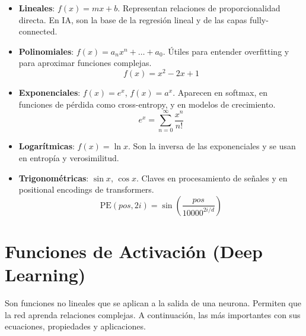 \documentclass[12pt,a4paper,openany,oneside]{book}
\begin{document}
\begin{itemize}
    \item \textbf{Lineales}: $f(x) = mx + b$. Representan relaciones de proporcionalidad directa. En IA, son la base de la regresión lineal y de las capas fully-connected.
    \begin{center}
    \end{center}
    
    \item \textbf{Polinomiales}: $f(x) = a_n x^n + \dots + a_0$. Útiles para entender overfitting y para aproximar funciones complejas.
    \begin{equation*}
    f(x) = x^2 - 2x + 1
    \end{equation*}
    
    \item \textbf{Exponenciales}: $f(x) = e^x$, $f(x) = a^x$. Aparecen en softmax, en funciones de pérdida como cross-entropy, y en modelos de crecimiento.
    \begin{equation*}
    e^x = \sum_{n=0}^{\infty} \frac{x^n}{n!}
    \end{equation*}
    
    \item \textbf{Logarítmicas}: $f(x) = \ln x$. Son la inversa de las exponenciales y se usan en entropía y verosimilitud.
    
    \item \textbf{Trigonométricas}: $\sin x$, $\cos x$. Claves en procesamiento de señales y en positional encodings de transformers.
    \begin{equation*}
    \text{PE}(pos, 2i) = \sin\left(\frac{pos}{10000^{2i/d}}\right)
    \end{equation*}
\end{itemize}

\section{Funciones de Activación (Deep Learning)}
Son funciones no lineales que se aplican a la salida de una neurona. Permiten que la red aprenda relaciones complejas. A continuación, las más importantes con sus ecuaciones, propiedades y aplicaciones.
\end{document}
